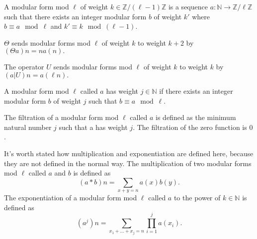 \begin{definition} 
  \label{def:ModularFormMod}
  \leanok
  A modular form mod $\ell$ of weight $k \in \mathbb{Z} / (\ell - 1) \mathbb{Z}$ is a sequence $a : \mathbb{N} → \mathbb{Z} / \ell \mathbb{Z}$
  such that there exists an integer modular form $b$ of weight $k'$ where
  $b \equiv a \mod \ell$ and $k' \equiv k \mod (\ell - 1)$.
\end{definition}


\begin{definition} [Theta]
  \label{def:Theta}
  \leanok
  $\Theta$ sends modular forms mod $\ell$ of weight $k$ to weight $k + 2$ by \\
  $(\Theta a) n = n a(n).$

\end{definition}

\begin{definition} [U Operator]
  \label{def:U_Operator}
  \leanok
  The operator $U$ sends modular forms mod $\ell$ of weight $k$ to weight $k$ by \\
  $ (a|U) n = a(\ell n).$
\end{definition}

\begin{definition} [hasWeight]
  \label{def:hasWeight}
  \leanok
  A modular form mod $\ell$ called $a$ has weight $j \in \mathbb{N}$ if
  there exists an integer modular form $b$ of weight $j$ such that $b \equiv a \mod \ell$.
\end{definition}

\begin{definition} [Filtration]
  \label{def:Filtration}
  \leanok
  The filtration of a modular form mod $\ell$ called $a$ is defined as the minimum natural number $j$ such that a has weight $j$. 
  The filtration of the zero function is $0$.
\end{definition}

\begin{definition} 
  \label{def:mul&pow}
  \leanok
  It's worth stated how multiplication and exponentiation are defined here, because they are not defined in the normal way.
  The multiplication of two modular forms mod $\ell$ called $a$ and $b$ is defined as 
  \[(a * b) n = \sum_{x + y = n} a(x) b(y).\] 
  The exponentiation of a modular form mod $\ell$ called $a$ to the power of $k \in \mathbb{N}$ is defined as 
  \[(a^j) n = \sum_ {x_1 + ... + x_j = n} \prod_{i = 1}^j a (x_i).\]
\end{definition}


